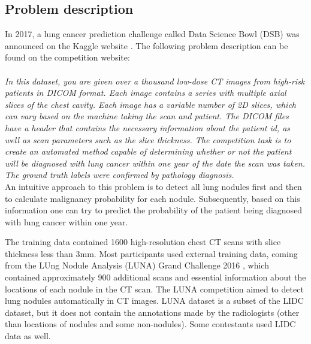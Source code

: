 \documentclass[12pt]{article}
\begin{document}
\subsection{Problem description}
In 2017, a lung cancer prediction challenge called Data Science Bowl (DSB) was announced on the Kaggle website \citep{kaggle}. The following problem description can be found on the competition website:
\\\\ 
\textit{In this dataset, you are given over a thousand low-dose CT images from high-risk patients in DICOM format. Each image contains a series with multiple axial slices of the chest cavity. Each image has a variable number of 2D slices, which can vary based on the machine taking the scan and patient. The DICOM files have a header that contains the necessary information about the patient id, as well as scan parameters such as the slice thickness. The competition task is to create an automated method capable of determining whether or not the patient will be diagnosed with lung cancer within one year of the date the scan was taken. The ground truth labels were confirmed by pathology diagnosis.}\\

An intuitive approach to this problem is to detect all lung nodules first and then to calculate malignancy probability for each nodule. Subsequently, based on this information one can try to predict the probability of the patient being diagnosed with lung cancer within one year.


The training data contained 1600 high-resolution chest CT scans with slice thickness less than 3mm. Most participants used external training data, coming from the LUng Nodule Analysis (LUNA) Grand Challenge 2016 \citep{luna}, which contained approximately 900 additional scans and essential information about the locations of each nodule in the CT scan. The LUNA competition aimed to detect lung nodules automatically in CT images. LUNA dataset is a subset of the LIDC dataset, but it does not contain the annotations made by the radiologists (other than locations of nodules and some non-nodules). Some contestants used LIDC data as well.
\end{document}

